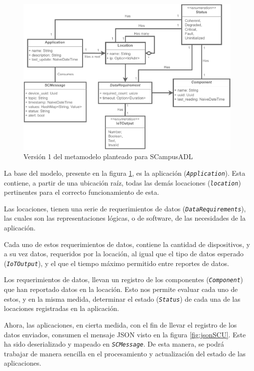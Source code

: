 \begin{figure}[H]
    \centering
    \caption{Versión 1 del metamodelo planteado para SCampusADL}
    \label{fig:metamodelo}
    \vspace{2mm}
    \includegraphics[width=\linewidth]{images/Metamodel B.pdf}
\end{figure}


La base del modelo, presente en la figura \ref{fig:metamodelo}, es la aplicación (\textit{\texttt{Application}}). Esta contiene, a partir de una ubicación raíz, todas las demás locaciones (\textit{\texttt{location}}) pertinentes para el correcto funcionamiento de esta.

Las locaciones, tienen una serie de requerimientos de datos (\texttt{\textit{DataRequirements}}), las cuales son las representaciones lógicas, o de software, de las necesidades de la aplicación.

Cada uno de estos requerimientos de datos, contiene la cantidad de dispositivos, y a su vez datos, requeridos por la locación, al igual que el tipo de datos esperado (\textit{\texttt{IoTOutput}}), y el que el tiempo máximo permitido entre reportes de datos. 

Los requerimientos de datos, llevan un registro de los componentes (\textit{\texttt{Component}}) que han reportado datos en la locación. Esto nos permite evaluar cada uno de estos, y en la misma medida, determinar el estado (\textit{\texttt{Status}}) de cada una de las locaciones registradas en la aplicación.

Ahora, las aplicaciones, en cierta medida, con el fin de llevar el registro de los datos enviados, consumen el mensaje JSON visto en la figura \ref{fig:jsonSCU}. Este ha sido deserializado y mapeado en \textit{\texttt{SCMessage}}. De esta manera, se podrá trabajar de manera sencilla en el procesamiento y actualización del estado de las aplicaciones.

